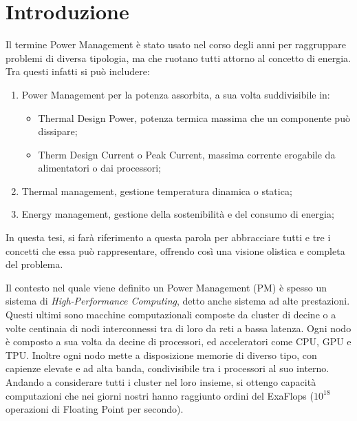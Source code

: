 \chapter{Introduzione}
Il termine Power Management è stato usato nel corso degli anni per raggruppare problemi di diversa tipologia, ma che ruotano tutti attorno al concetto di energia.
Tra questi infatti si può includere:
\begin{enumerate}
    \item Power Management per la potenza assorbita, a sua volta suddivisibile in:
    \begin{itemize}
        \item Thermal Design Power, potenza termica massima che un componente può dissipare;
        \item Therm Design Current o Peak Current, massima corrente erogabile da alimentatori o dai processori;
    \end{itemize}
    \item Thermal management, gestione temperatura dinamica o statica;
    \item Energy management, gestione della sostenibilità e del consumo di energia;
\end{enumerate}

\noindent In questa tesi, si farà riferimento a questa parola per abbracciare tutti e tre i concetti che essa può rappresentare, offrendo così una visione olistica e completa del problema.

Il contesto nel quale viene definito un Power Management (PM) è spesso un sistema di \emph{High-Performance Computing}, detto anche sistema ad alte prestazioni. Questi ultimi sono macchine computazionali composte da cluster di decine o a volte centinaia di nodi interconnessi tra di loro da reti a bassa latenza. Ogni nodo è composto a sua volta da decine di processori, ed acceleratori come CPU, GPU e TPU.
Inoltre ogni nodo mette a disposizione memorie di diverso tipo, con capienze elevate e ad alta banda, condivisibile tra i processori al suo interno. Andando a considerare tutti i cluster nel loro insieme, si ottengo capacità computazioni che nei giorni nostri hanno raggiunto ordini del ExaFlops ($10^{18}$ operazioni di Floating Point per secondo). 

